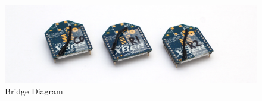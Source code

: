 \begin{figure}[H]
\begin{center}
\includegraphics[width=12cm]{images/photos/edited/zigbees}
\end{center}
\caption{Bridge Diagram}
\label{fig:Bridge Diagram}
\end{figure}
